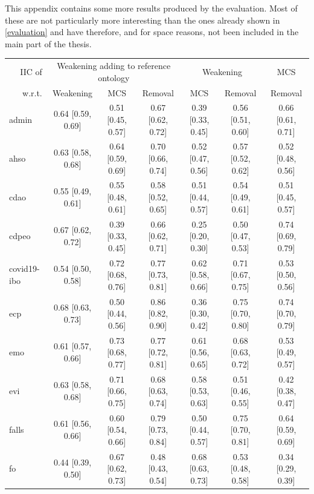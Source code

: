 
This appendix contains some more results produced by the evaluation. Most of these are not particularly more interesting than the ones already shown in \cref{evaluation} and have therefore, and for space reasons, not been included in the main part of the thesis.

\begin{table}[htbp]
  \scriptsize
  \begin{widepage}
    \centering
    \begin{tabular}{|l|cccccc|}
      \cline{2-7}
      \multicolumn{1}{r|}{IIC of} & \multicolumn{3}{c}{Weakening adding to reference ontology} & \multicolumn{2}{c}{Weakening} & MCS \\
      \multicolumn{1}{r|}{w.r.t.} & Weakening & MCS & Removal & MCS & Removal & Removal \\
      \hline
      admin & 0.64 [0.59, 0.69] & 0.51 [0.45, 0.57] & 0.67 [0.62, 0.72] & 0.39 [0.33, 0.45] & 0.56 [0.51, 0.60] & 0.66 [0.61, 0.71] \\
      ahso & 0.63 [0.58, 0.68] & 0.64 [0.59, 0.69] & 0.70 [0.66, 0.74] & 0.52 [0.47, 0.56] & 0.57 [0.52, 0.62] & 0.52 [0.48, 0.56] \\
      cdao & 0.55 [0.49, 0.61] & 0.55 [0.48, 0.61] & 0.58 [0.52, 0.65] & 0.51 [0.44, 0.57] & 0.54 [0.49, 0.61] & 0.51 [0.45, 0.57] \\
      cdpeo & 0.67 [0.62, 0.72] & 0.39 [0.33, 0.45] & 0.66 [0.62, 0.71] & 0.25 [0.20, 0.30] & 0.50 [0.47, 0.53] & 0.74 [0.69, 0.79] \\
      covid19-ibo & 0.54 [0.50, 0.58] & 0.72 [0.68, 0.76] & 0.77 [0.73, 0.81] & 0.62 [0.58, 0.66] & 0.71 [0.67, 0.75] & 0.53 [0.50, 0.56] \\
      ecp & 0.68 [0.63, 0.73] & 0.50 [0.44, 0.56] & 0.86 [0.82, 0.90] & 0.36 [0.30, 0.42] & 0.75 [0.70, 0.80] & 0.74 [0.70, 0.79] \\
      emo & 0.61 [0.57, 0.66] & 0.73 [0.68, 0.77] & 0.77 [0.72, 0.81] & 0.61 [0.56, 0.65] & 0.68 [0.63, 0.72] & 0.53 [0.49, 0.57] \\
      evi & 0.63 [0.58, 0.68] & 0.71 [0.66, 0.75] & 0.68 [0.63, 0.74] & 0.58 [0.53, 0.63] & 0.51 [0.46, 0.55] & 0.42 [0.38, 0.47] \\
      falls & 0.61 [0.56, 0.66] & 0.60 [0.54, 0.66] & 0.79 [0.73, 0.84] & 0.50 [0.44, 0.57] & 0.75 [0.70, 0.81] & 0.64 [0.59, 0.69] \\
      fo & 0.44 [0.39, 0.50] & 0.67 [0.62, 0.73] & 0.48 [0.43, 0.54] & 0.68 [0.63, 0.73] & 0.53 [0.48, 0.58] & 0.34 [0.29, 0.39] \\

\end{tabular}
\end{widepage}
\end{table}
